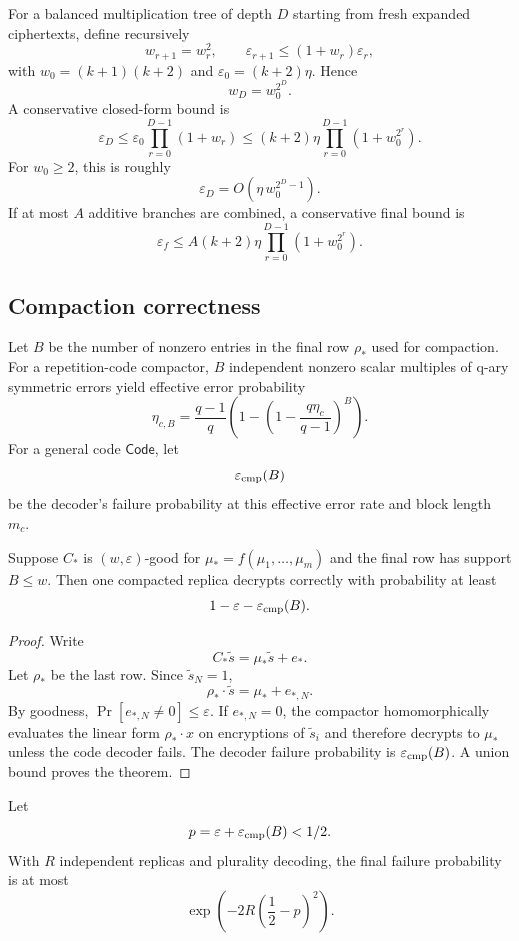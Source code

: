 For a balanced multiplication tree of depth $D$ starting from fresh expanded ciphertexts, define recursively
\[
    w_{r+1}=w_r^2,
    \qquad
    \varepsilon_{r+1}\le (1+w_r)\varepsilon_r,
\]
with $w_0=(k+1)(k+2)$ and $\varepsilon_0=(k+2)\eta$.  Hence
\[
    w_D=w_0^{2^D}.
\]
A conservative closed-form bound is
\[
    \varepsilon_D
    \le
    \varepsilon_0\prod_{r=0}^{D-1}(1+w_r)
    \le
    (k+2)\eta\prod_{r=0}^{D-1}(1+w_0^{2^r}).
\]
For $w_0\ge2$, this is roughly
\[
    \varepsilon_D=O\left(\eta\,w_0^{2^D-1}\right).
\]
If at most $A$ additive branches are combined, a conservative final bound is
\[
    \varepsilon_f\le A(k+2)\eta\prod_{r=0}^{D-1}(1+w_0^{2^r}).
\]

\subsection{Compaction correctness}

Let $B$ be the number of nonzero entries in the final row $\rho_*$ used for compaction.  For a repetition-code compactor, $B$ independent nonzero scalar multiples of q-ary symmetric errors yield effective error probability
\[
    \eta_{c,B}=\frac{q-1}{q}\left(1-\left(1-\frac{q\eta_c}{q-1}\right)^B\right).
\]
For a general code $\mathsf{Code}$, let
\[
    \varepsilon_{\rm cmp}(B)
\]
be the decoder's failure probability at this effective error rate and block length $m_c$.

\begin{theorem}
\label{thm:one-replica-correctness}
Suppose $C_*$ is $(w,\varepsilon)$-good for $\mu_*=f(\mu_1,\ldots,\mu_m)$ and the final row has support $B\le w$.  Then one compacted replica decrypts correctly with probability at least
\[
    1-\varepsilon-\varepsilon_{\rm cmp}(B).
\]
\end{theorem}

\begin{proof}
Write
\[
    C_*\tilde{s}=\mu_*\tilde{s}+e_*.
\]
Let $\rho_*$ be the last row.  Since $\tilde{s}_N=1$,
\[
    \rho_*\cdot\tilde{s}=\mu_*+e_{*,N}.
\]
By goodness, $\Pr[e_{*,N}\ne0]\le\varepsilon$.  If $e_{*,N}=0$, the compactor homomorphically evaluates the linear form $\rho_*\cdot x$ on encryptions of $\tilde{s}_i$ and therefore decrypts to $\mu_*$ unless the code decoder fails.  The decoder failure probability is $\varepsilon_{\rm cmp}(B)$.  A union bound proves the theorem.
\end{proof}

\begin{theorem}
\label{thm:replicated-correctness}
Let
\[
    p=\varepsilon+\varepsilon_{\rm cmp}(B)<1/2.
\]
With $R$ independent replicas and plurality decoding, the final failure probability is at most
\[
    \exp\left(-2R\left(\frac12-p\right)^2\right).
\]
\end{theorem}

